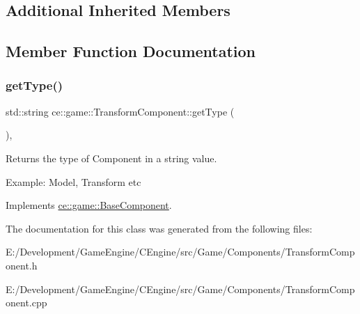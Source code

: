 \subsection*{Additional Inherited Members}


\subsection{Member Function Documentation}
\mbox{\label{classce_1_1game_1_1_transform_component_ae4a2729b3f88a77b8405de317ab03510}} 
\subsubsection{\texorpdfstring{get\+Type()}{getType()}}
{\footnotesize\ttfamily std\+::string ce\+::game\+::\+Transform\+Component\+::get\+Type (\begin{DoxyParamCaption}{ }\end{DoxyParamCaption})\hspace{0.3cm}{\ttfamily [override]}, {\ttfamily [virtual]}}



Returns the type of Component in a string value. 

Example\+: Model, Transform etc 

Implements \hyperlink{classce_1_1game_1_1_base_component_a1022b55c1926a019a2b3a71fb6b9150e}{ce\+::game\+::\+Base\+Component}.



The documentation for this class was generated from the following files\+:\begin{DoxyCompactItemize}
\item 
E\+:/\+Development/\+Game\+Engine/\+C\+Engine/src/\+Game/\+Components/Transform\+Component.\+h\item 
E\+:/\+Development/\+Game\+Engine/\+C\+Engine/src/\+Game/\+Components/Transform\+Component.\+cpp\end{DoxyCompactItemize}
